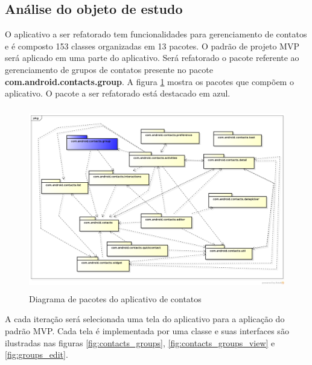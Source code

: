 \documentclass[conference]{IEEEtran}
\begin{document}
\subsection{Análise do objeto de estudo}

O aplicativo a ser refatorado tem funcionalidades para gerenciamento de
contatos e é composto 153 classes organizadas em 13 pacotes. O padrão
de projeto MVP será aplicado em uma parte do aplicativo. Será refatorado o
pacote referente ao gerenciamento de grupos de contatos presente no pacote
\textbf{com.android.contacts.group}. A figura \ref{fig:pacotes_contacts}
mostra os pacotes que compõem o aplicativo. O pacote a ser refatorado está
destacado em azul.

\begin{figure}[htb]
	\begin{center}
		\includegraphics[height=8cm,width=\textwidth]{img/pacotes_contacts.png}
	\end{center}
	\caption{\label{fig:pacotes_contacts} Diagrama de pacotes do aplicativo de contatos}	
\end{figure}

A cada iteração será selecionada uma tela do aplicativo para a aplicação do
padrão MVP. Cada tela é implementada por uma classe e suas interfaces
são ilustradas nas figuras \ref{fig:contacts_groups},
\ref{fig:contacts_groups_view} e \ref{fig:groups_edit}. 
\end{document}
